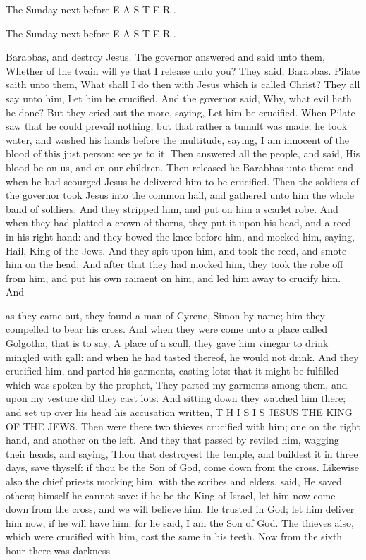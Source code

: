 The Sunday next before E A S T E R .

The Sunday next before E A S T E R .

Barabbas, and destroy Jesus. The governor answered and said unto them, Whether of the twain will ye that I release unto you? They said, Barabbas. Pilate saith unto them, What shall I do then with Jesus which is called Christ? They all say unto him, Let him be crucified. And the governor said, Why, what evil hath he done? But they cried out the more, saying, Let him be crucified. When Pilate saw that he could prevail nothing, but that rather a tumult was made, he took water, and washed his hands before the multitude, saying, I am innocent of the blood of this just person: see ye to it. Then answered all the people, and said, His blood be on us, and on our children. Then released he Barabbas unto them: and when he had scourged Jesus he delivered him to be crucified. Then the soldiers of the governor took Jesus into the common hall, and gathered unto him the whole band of soldiers. And they stripped him, and put on him a scarlet robe. And when they had platted a crown of thorns, they put it upon his head, and a reed in his right hand: and they bowed the knee before him, and mocked him, saying, Hail, King of the Jews. And they spit upon him, and took the reed, and smote him on the head. And after that they had mocked him, they took the robe off from him, and put his own raiment on him, and led him away to crucify him. And

as they came out, they found a man of Cyrene, Simon by name; him they compelled to bear his cross. And when they were come unto a place called Golgotha, that is to say, A place of a scull, they gave him vinegar to drink mingled with gall: and when he had tasted thereof, he would not drink. And they crucified him, and parted his garments, casting lots: that it might be fulfilled which was spoken by the prophet, They parted my garments among them, and upon my vesture did they cast lots. And sitting down they watched him there; and set up over his head his accusation written, T H I S I S JESUS THE KING OF THE JEWS. Then were there two thieves crucified with him; one on the right hand, and another on the left. And they that passed by reviled him, wagging their heads, and saying, Thou that destroyest the temple, and buildest it in three days, save thyself: if thou be the Son of God, come down from the cross. Likewise also the chief priests mocking him, with the scribes and elders, said, He saved others; himself he cannot save: if he be the King of Israel, let him now come down from the cross, and we will believe him. He trusted in God; let him deliver him now, if he will have him: for he said, I am the Son of God. The thieves also, which were crucified with him, cast the same in his teeth. Now from the sixth hour there was darkness

